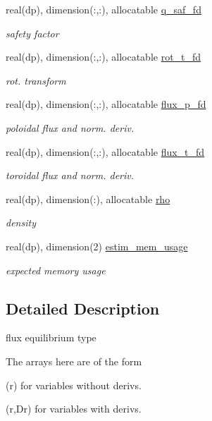 \begin{DoxyCompactItemize}
real(dp), dimension(\+:,\+:), allocatable \hyperlink{structeq__vars_1_1eq__1__type_a7a513de633cd065f90ed716bd1290cb6}{q\+\_\+saf\+\_\+fd}
\begin{DoxyCompactList}\small\item\em safety factor \end{DoxyCompactList}\item 
real(dp), dimension(\+:,\+:), allocatable \hyperlink{structeq__vars_1_1eq__1__type_ac21c7335fe66b850573b5725d592f955}{rot\+\_\+t\+\_\+fd}
\begin{DoxyCompactList}\small\item\em rot. transform \end{DoxyCompactList}\item 
real(dp), dimension(\+:,\+:), allocatable \hyperlink{structeq__vars_1_1eq__1__type_a4511914b57052c66f7e778ca7b5f85bf}{flux\+\_\+p\+\_\+fd}
\begin{DoxyCompactList}\small\item\em poloidal flux and norm. deriv. \end{DoxyCompactList}\item 
real(dp), dimension(\+:,\+:), allocatable \hyperlink{structeq__vars_1_1eq__1__type_a1919e919cc6ae9e6bd6ceb692bb599cd}{flux\+\_\+t\+\_\+fd}
\begin{DoxyCompactList}\small\item\em toroidal flux and norm. deriv. \end{DoxyCompactList}\item 
real(dp), dimension(\+:), allocatable \hyperlink{structeq__vars_1_1eq__1__type_aeec97865921d38a3134e57b8ca545f99}{rho}
\begin{DoxyCompactList}\small\item\em density \end{DoxyCompactList}\item 
real(dp), dimension(2) \hyperlink{structeq__vars_1_1eq__1__type_ad35da6e4c99f85c7f74b1e57b855b92c}{estim\+\_\+mem\+\_\+usage}
\begin{DoxyCompactList}\small\item\em expected memory usage \end{DoxyCompactList}\end{DoxyCompactItemize}


\subsection{Detailed Description}
flux equilibrium type 

The arrays here are of the form
\begin{DoxyItemize}
\item {\ttfamily (r)} for variables without derivs.
\item {\ttfamily (r,Dr)} for variables with derivs. 
\end{DoxyItemize}

